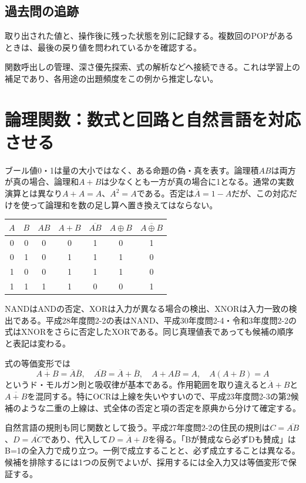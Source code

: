 \subsection{過去問の追跡}
取り出された値と、操作後に残った状態を別に記録する。複数回のPOPがあるときは、最後の戻り値を問われているかを確認する。
\begin{tcolorbox}[title=情報工学への接続]
関数呼出しの管理、深さ優先探索、式の解析などへ接続できる。これは学習上の補足であり、各用途の出題頻度をこの例から推定しない。
\end{tcolorbox}

\section{論理関数：数式と回路と自然言語を対応させる}
\label{theory:information:boolean}
ブール値0・1は量の大小ではなく、ある命題の偽・真を表す。論理積\(AB\)は両方が真の場合、論理和\(A+B\)は少なくとも一方が真の場合に1となる。通常の実数演算とは異なり\(A+A=A\)、\(A^2=A\)である。否定は\(\overline A=1-A\)だが、この対応だけを使って論理和を数の足し算へ置き換えてはならない。

\begin{center}
\begin{tabular}{cc|ccccc}
\(A\)&\(B\)&\(AB\)&\(A+B\)&\(\overline{AB}\)&\(A\oplus B\)&\(\overline{A\oplus B}\)\\\hline
0&0&0&0&1&0&1\\
0&1&0&1&1&1&0\\
1&0&0&1&1&1&0\\
1&1&1&1&0&0&1
\end{tabular}
\end{center}

NANDはANDの否定、XORは入力が異なる場合の検出、XNORは入力一致の検出である。平成28年度問2-2の表はNAND、平成30年度問2-4・令和3年度問2-2の式はXNORをさらに否定したXORである。同じ真理値表であっても候補の順序と表記は変わる。

式の等価変形では
\[
 \overline{A+B}=\overline A\overline B,\quad
 \overline{AB}=\overline A+\overline B,\quad
 A+AB=A,\quad A(A+B)=A
\]
というド・モルガン則と吸収律が基本である。作用範囲を取り違えると\(\overline A+B\)と\(\overline{A+B}\)を混同する。特にOCRは上線を失いやすいので、平成23年度問2-3の第2候補のような二重の上線は、式全体の否定と項の否定を原典から分けて確定する。

自然言語の規則も同じ関数として扱う。平成27年度問2-2の住民の規則は\(C=\overline{AB}\)、\(D=\overline{AC}\)であり、代入して\(D=\overline A+B\)を得る。「Bが賛成なら必ずDも賛成」はB=1の全入力で成り立つ。一例で成立することと、必ず成立することは異なる。候補を排除するには1つの反例でよいが、採用するには全入力又は等価変形で保証する。

